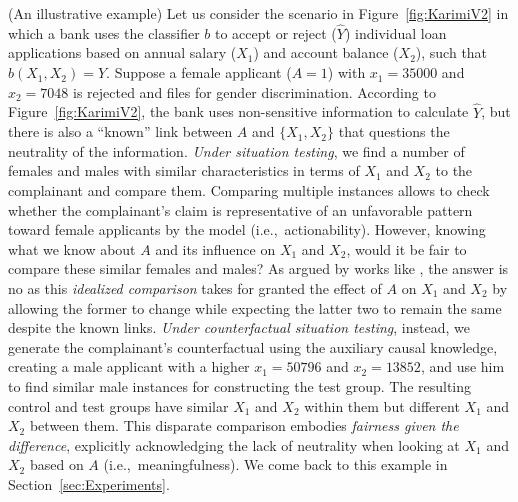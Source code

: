 %
\begin{example}(An illustrative example)
\label{ex:IllustrativeExample}
    Let us consider the scenario in Figure~\ref{fig:KarimiV2} in which a bank uses the classifier $b$ to accept or reject ($\hat{Y}$) individual loan applications based on annual salary ($X_1$) and account balance ($X_2$), such that $b(X_1, X_2) = \hat{Y}$. 
    Suppose a female applicant ($A=1$) with $x_1= 35000$ and $x_2=7048$ is rejected and files for gender discrimination. 
    According to Figure~\ref{fig:KarimiV2}, the bank uses non-sensitive information to calculate $\hat{Y}$, but there is also a ``known'' link between $A$ and $\{X_1, X_2\}$ that questions the neutrality of the information. 
    \textit{Under situation testing}, we find a number of females and males with similar characteristics in terms of $X_1$ and $X_2$ to the complainant and compare them.
    Comparing multiple instances allows to check whether the complainant's claim is representative of an unfavorable pattern toward female applicants by the model (i.e.,~actionability). 
    However, knowing what we know about $A$ and its influence on $X_1$ and $X_2$, would it be fair to compare these similar females and males? 
    As argued by works like \textcite{Kohler2018CausalEddie}, the answer is no as this \textit{idealized comparison} 
    takes for granted the effect of $A$ on $X_1$ and $X_2$ by allowing the former to change while expecting the latter two to remain the same despite the known links.
    \textit{Under counterfactual situation testing}, instead, we generate the complainant's counterfactual using the auxiliary causal knowledge, creating a male applicant with a higher $x_1=50796$ and $x_2=13852$, and use him 
    to find similar male instances for constructing the test group.
    The resulting control and test groups have similar $X_1$ and $X_2$ within them but different $X_1$ and $X_2$ between them. 
    This disparate comparison embodies \textit{fairness given the difference}, explicitly acknowledging the lack of neutrality when looking at $X_1$ and $X_2$ based on $A$ (i.e.,~meaningfulness).
    We come back to this example in Section~\ref{sec:Experiments}.
\end{example}
%

